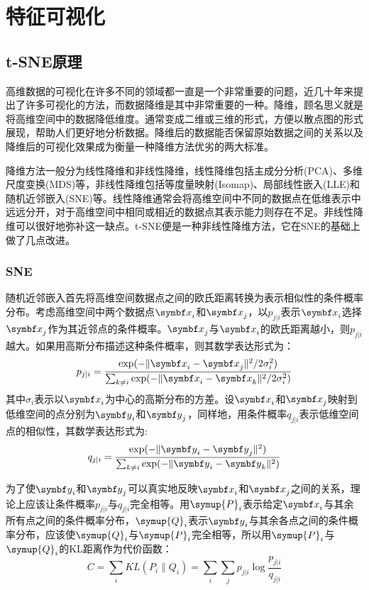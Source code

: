 
\chapter{特征可视化}

\section{t-SNE原理}

高维数据的可视化在许多不同的领域都一直是一个非常重要的问题，近几十年来提出了许多可视化的方法，而数据降维是其中非常重要的一种。降维，顾名思义就是将高维空间中的数据降低维度。通常变成二维或三维的形式，方便以散点图的形式展现，帮助人们更好地分析数据。降维后的数据能否保留原始数据之间的关系以及降维后的可视化效果成为衡量一种降维方法优劣的两大标准。

降维方法一般分为线性降维和非线性降维，线性降维包括主成分分析(PCA)、多维尺度变换(MDS)等，非线性降维包括等度量映射(Isomap)、局部线性嵌入(LLE)和随机近邻嵌入(SNE)等。线性降维通常会将高维空间中不同的数据点在低维表示中远远分开，对于高维空间中相同或相近的数据点其表示能力则存在不足。非线性降维可以很好地弥补这一缺点。t-SNE便是一种非线性降维方法，它在SNE的基础上做了几点改进。

\subsection{SNE}

随机近邻嵌入首先将高维空间数据点之间的欧氏距离转换为表示相似性的条件概率分布。考虑高维空间中两个数据点$\vx_i$和$\vx_j$，以$p_{j|i}$表示$\vx_i$选择$\vx_j$作为其近邻点的条件概率。$\vx_j$与$\vx_i$的欧氏距离越小，则$p_{j|i}$越大。如果用高斯分布描述这种条件概率，则其数学表达形式为：
\begin{equation}
	p_{j|i} = \frac{\exp(-\lVert \vx_i-\vx_j\rVert^2 /2\sigma_{i}^{2})}{\sum_{k\ne i}{\exp(-\lVert \vx_i-\vx_k \rVert^2 /2\sigma_{i}^{2})}}
\end{equation}
\noindent
其中$\sigma_i$表示以$\vx_i$为中心的高斯分布的方差。设$\vx_i$和$\vx_j$映射到低维空间的点分别为$\vy_i$和$\vy_j$，同样地，用条件概率$q_{j|i}$表示低维空间点的相似性，其数学表达形式为:
\begin{equation}
	q_{j|i} = \frac{\exp(-\lVert \vy_i-\vy_j\rVert^2 )}{\sum_{k\ne i}{\exp(-\lVert \vy_i-\vy_k \rVert^2 )}}
\end{equation}

为了使$\vy_i$和$\vy_j$可以真实地反映$\vx_i$和$\vx_j$之间的关系，理论上应该让条件概率$p_{j|i}$与$q_{j|i}$完全相等。用$\symup{P}_i$表示给定$\vx_i$与其余所有点之间的条件概率分布，$\symup{Q}_i$表示$\vy_i$与其余各点之间的条件概率分布，应该使$\symup{Q}_i$与$\symup{P}_i$完全相等，所以用$\symup{P}_i$与$\symup{Q}_i$的KL距离作为代价函数：
\begin{equation}
	C=\sum_{i}{KL(P_i \lVert Q_i)}=\sum_{i}{\sum_{j}{p_{j|i}\log\frac{p_{j|i}}{q_{j|i}}}}
\end{equation}


